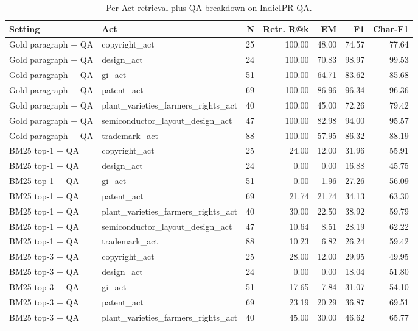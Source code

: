 \begin{table}[htbp]
\centering
\caption{Per-Act retrieval plus QA breakdown on IndicIPR-QA.}
\label{tab:retrieval_qa_per_act}
\scriptsize
\begin{tabular}{llrrrrr}
\toprule
Setting & Act & N & Retr. R@k & EM & F1 & Char-F1 \\
\midrule
Gold paragraph + QA & copyright\_act & 25 & 100.00 & 48.00 & 74.57 & 77.64 \\
Gold paragraph + QA & design\_act & 24 & 100.00 & 70.83 & 98.97 & 99.53 \\
Gold paragraph + QA & gi\_act & 51 & 100.00 & 64.71 & 83.62 & 85.68 \\
Gold paragraph + QA & patent\_act & 69 & 100.00 & 86.96 & 96.34 & 96.36 \\
Gold paragraph + QA & plant\_varieties\_farmers\_rights\_act & 40 & 100.00 & 45.00 & 72.26 & 79.42 \\
Gold paragraph + QA & semiconductor\_layout\_design\_act & 47 & 100.00 & 82.98 & 94.00 & 95.57 \\
Gold paragraph + QA & trademark\_act & 88 & 100.00 & 57.95 & 86.32 & 88.19 \\
BM25 top-1 + QA & copyright\_act & 25 & 24.00 & 12.00 & 31.96 & 55.91 \\
BM25 top-1 + QA & design\_act & 24 & 0.00 & 0.00 & 16.88 & 45.75 \\
BM25 top-1 + QA & gi\_act & 51 & 0.00 & 1.96 & 27.26 & 56.09 \\
BM25 top-1 + QA & patent\_act & 69 & 21.74 & 21.74 & 34.13 & 63.30 \\
BM25 top-1 + QA & plant\_varieties\_farmers\_rights\_act & 40 & 30.00 & 22.50 & 38.92 & 59.79 \\
BM25 top-1 + QA & semiconductor\_layout\_design\_act & 47 & 10.64 & 8.51 & 28.19 & 62.22 \\
BM25 top-1 + QA & trademark\_act & 88 & 10.23 & 6.82 & 26.24 & 59.42 \\
BM25 top-3 + QA & copyright\_act & 25 & 28.00 & 12.00 & 29.95 & 49.95 \\
BM25 top-3 + QA & design\_act & 24 & 0.00 & 0.00 & 18.04 & 51.80 \\
BM25 top-3 + QA & gi\_act & 51 & 17.65 & 7.84 & 31.07 & 54.10 \\
BM25 top-3 + QA & patent\_act & 69 & 23.19 & 20.29 & 36.87 & 69.51 \\
BM25 top-3 + QA & plant\_varieties\_farmers\_rights\_act & 40 & 45.00 & 30.00 & 46.62 & 65.77 \\

\end{tabular}
\end{table}
